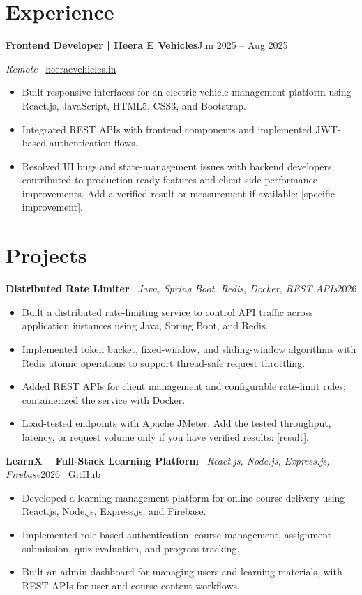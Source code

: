 \documentclass[10pt,letterpaper]{article}
\newcommand{\entry}[2]{\textbf{#1}\hfill #2\par}
\newcommand{\project}[3]{\textbf{#1} \textbar\ \textit{#2}\hfill #3\par}
\begin{document}
\section{Experience}
\entry{Frontend Developer | Heera E Vehicles}{Jun 2025 -- Aug 2025}
\textit{Remote} \textbar\ \href{https://heeraevehicles.in}{heeraevehicles.in}
\begin{itemize}
    \item Built responsive interfaces for an electric vehicle management platform using React.js, JavaScript, HTML5, CSS3, and Bootstrap.
    \item Integrated REST APIs with frontend components and implemented JWT-based authentication flows.
    \item Resolved UI bugs and state-management issues with backend developers; contributed to production-ready features and client-side performance improvements. Add a verified result or measurement if available: [specific improvement].
\end{itemize}

\section{Projects}
\project{Distributed Rate Limiter}{Java, Spring Boot, Redis, Docker, REST APIs}{2026}
\begin{itemize}
    \item Built a distributed rate-limiting service to control API traffic across application instances using Java, Spring Boot, and Redis.
    \item Implemented token bucket, fixed-window, and sliding-window algorithms with Redis atomic operations to support thread-safe request throttling.
    \item Added REST APIs for client management and configurable rate-limit rules; containerized the service with Docker.
    \item Load-tested endpoints with Apache JMeter. Add the tested throughput, latency, or request volume only if you have verified results: [result].
\end{itemize}

\project{LearnX -- Full-Stack Learning Platform}{React.js, Node.js, Express.js, Firebase}{2026 \textbar\ \href{https://github.com/Manikanta001}{GitHub}}
\begin{itemize}
    \item Developed a learning management platform for online course delivery using React.js, Node.js, Express.js, and Firebase.
    \item Implemented role-based authentication, course management, assignment submission, quiz evaluation, and progress tracking.
    \item Built an admin dashboard for managing users and learning materials, with REST APIs for user and course content workflows.
\end{itemize}
\end{document}
